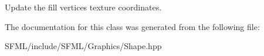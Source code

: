 Update the fill vertices\textquotesingle{} texture coordinates. 

\begin{DoxyVerb}\end{DoxyVerb}
 

The documentation for this class was generated from the following file\+:\begin{DoxyCompactItemize}
\item 
S\+F\+M\+L/include/\+S\+F\+M\+L/\+Graphics/Shape.\+hpp\end{DoxyCompactItemize}
